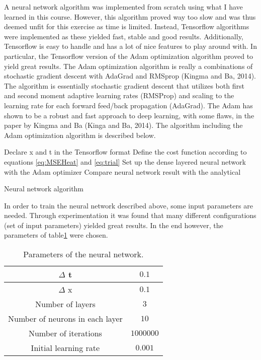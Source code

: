 \documentclass[12pt,a4paper]{article}
\begin{document}
\noindent A neural network algorithm was implemented from scratch using what I have learned in this course. However, this algorithm proved way too slow and was thus deemed unfit for this exercise as time is limited. Instead, Tensorflow algorithms were implemented as these yielded fast, stable and good results. Additionally, Tensorflow is easy to handle and has a lot of nice features to play around with. In particular, the Tensorflow version of the Adam optimization algorithm proved to yield great results. The Adam optimization algorithm is really a combinations of stochastic gradient descent with AdaGrad and RMSprop (Kingma and Ba, 2014). The algorithm is essentially stochastic gradient descent that utilizes both first and second moment adaptive learning rates (RMSProp) and scaling to the learning rate for each forward feed/back propagation (AdaGrad). The Adam has shown to be a robust and fast approach to deep learning, with some flaws, in the paper by Kingma and Ba (Kinga and Ba, 2014). The algorithm including the Adam optimization algorithm is described below.

\begin{algorithm}[H]
\SetAlgoLined
{}
 Declare x and t in the Tensorflow format\;
 Define the cost function according to equations \ref{eq:MSEHeat} and \ref{eq:trial}\;
 Set up the dense layered neural network with the Adam optimizer\;
  Compare neural network result with the analytical
 \caption{Neural network algorithm}
\end{algorithm}

\noindent In order to train the neural network described above, some input parameters are needed. Through experimentation it was found that many different configurations (set of input parameters) yielded great results. In the end however, the parameters of table\ref{tab:NNparams} were chosen.

\begin{table}[h]
\caption{\label{tab:NNparams} Parameters of the neural network.}
\centering
\begin{tabular}{|c|c|}
\hline
$\Delta$ t & $0.1$\\
\hline
$\Delta$ x & $0.1$\\
\hline
Number of layers & $3$\\
\hline
Number of neurons in each layer & $10$\\
\hline
Number of iterations & $1000000$\\
\hline
Initial learning rate & $0.001$\\
\hline
\end{tabular}
\end{table}
\end{document}
